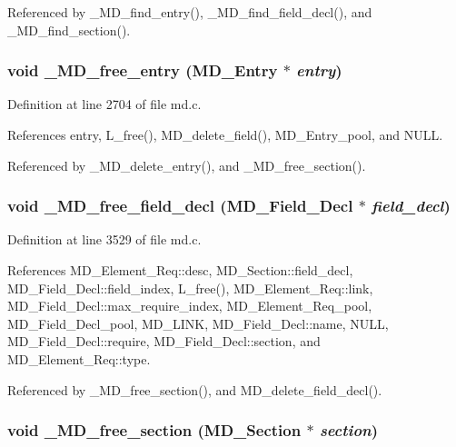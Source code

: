 Referenced by \_\-MD\_\-find\_\-entry(), \_\-MD\_\-find\_\-field\_\-decl(), and \_\-MD\_\-find\_\-section().
\subsubsection{\setlength{\rightskip}{0pt plus 5cm}void \_\-MD\_\-free\_\-entry (\bf{MD\_\-Entry} $\ast$ {\em entry})}\label{md_8h_95e36d143db61b0f52862cad546ac8c1}




Definition at line 2704 of file md.c.

References entry, L\_\-free(), MD\_\-delete\_\-field(), MD\_\-Entry\_\-pool, and NULL.

Referenced by \_\-MD\_\-delete\_\-entry(), and \_\-MD\_\-free\_\-section().
\subsubsection{\setlength{\rightskip}{0pt plus 5cm}void \_\-MD\_\-free\_\-field\_\-decl (\bf{MD\_\-Field\_\-Decl} $\ast$ {\em field\_\-decl})}\label{md_8h_a84268ad28784171bc614463e1ca7061}




Definition at line 3529 of file md.c.

References MD\_\-Element\_\-Req::desc, MD\_\-Section::field\_\-decl, MD\_\-Field\_\-Decl::field\_\-index, L\_\-free(), MD\_\-Element\_\-Req::link, MD\_\-Field\_\-Decl::max\_\-require\_\-index, MD\_\-Element\_\-Req\_\-pool, MD\_\-Field\_\-Decl\_\-pool, MD\_\-LINK, MD\_\-Field\_\-Decl::name, NULL, MD\_\-Field\_\-Decl::require, MD\_\-Field\_\-Decl::section, and MD\_\-Element\_\-Req::type.

Referenced by \_\-MD\_\-free\_\-section(), and MD\_\-delete\_\-field\_\-decl().
\subsubsection{\setlength{\rightskip}{0pt plus 5cm}void \_\-MD\_\-free\_\-section (\bf{MD\_\-Section} $\ast$ {\em section})}\label{md_8h_520a6f281d2970d87bc14e775ff06dfc}




